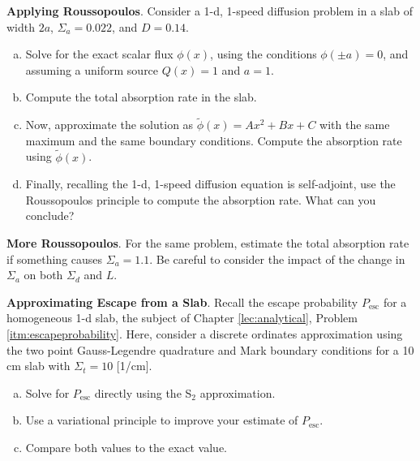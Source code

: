 \begin{exercises}
  \item  \textbf{Applying Roussopoulos}. 
    Consider a 1-d, 1-speed diffusion problem in a slab of 
    width $2a$, $\Sigma_a = 0.022$, and $D = 0.14$. 
    \begin{enumerate}[a.]
      \item Solve for the exact scalar flux $\phi(x)$, using the 
            conditions $\phi(\pm a)=0$, and
            assuming a uniform source $Q(x) = 1$ and $a=1$.
      \item Compute the total absorption rate in the slab.
      \item Now, approximate the solution as 
            $\tilde{\phi}(x) = Ax^2 + Bx +C$ with the same maximum 
            and the same boundary conditions.  Compute the absorption rate  
            using $\tilde{\phi}(x)$.
      \item Finally, recalling the 1-d, 1-speed diffusion equation is 
            self-adjoint, use the Roussopoulos principle to compute the 
            absorption rate.  What can you conclude? 
    \end{enumerate}

  \item \textbf{More Roussopoulos}. 
    For the same problem, estimate the total absorption rate if something 
    causes $\Sigma_a = 1.1$.  Be careful to consider the impact of the change 
    in $\Sigma_a$ on both $\Sigma_d$ and $L$.

  \item \textbf{Approximating Escape from a Slab}. 
    Recall the escape probability $P_{\text{esc}}$ for a homogeneous 1-d slab, 
    the subject of 
    Chapter \ref{lec:analytical}, Problem \ref{itm:escapeprobability}.  
    Here, consider a discrete ordinates approximation using the 
    two point Gauss-Legendre quadrature and Mark boundary conditions
    for a 10 cm slab with $\Sigma_t = 10$ [1/cm].
    \begin{enumerate}[a.]
      \item Solve for $P_{\text{esc}}$ directly using the S$_{\text{2}}$ 
            approximation.
      \item Use a variational principle to improve 
            your estimate of $P_{\text{esc}}$. 
      \item Compare both values to the exact value.
    \end{enumerate}

\end{exercises}
